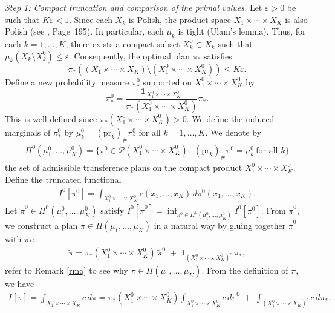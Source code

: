 \documentclass[twoside,11pt,a4paper]{article}
\newcommand*{\SavedRef}{}
\let\SavedRef\ref
\renewcommand*{\ref}[1]{  \begingroup
    \hypersetup{
      linkcolor=linkequation,
      linkbordercolor=linkequation,
    }    \SavedRef{#1}  \endgroup
}
\begin{document}
\medskip
\noindent\emph{Step 1: Compact truncation and comparison of the primal values.}
 Let $\varepsilon>0$ be such that $K\varepsilon<1$. Since each $X_k$ is Polish, the product space $X_1 \times \cdots \times X_K$ is also Polish (see \cite{bourbaki1998}, Page~195). In particular, each $\mu_k$ is tight (Ulam's lemma). Thus, for each 
$k=1,\dots,K$, there exists a compact subset $X_k^0 \subset X_k$ such that $\mu_k(X_k \setminus X_k^0) \le \varepsilon$. Consequently, the optimal plan $\pi_*$ satisfies
\begin{equation}\label{5}
\pi_*\!\left( (X_1 \times \cdots \times X_K) 
\setminus (X_1^0 \times \cdots \times X_K^0) \right)
\le K\varepsilon .
\end{equation}
Define a new probability measure $\pi^0_*$ supported on $X_1^0 \times \cdots \times X_K^0$ by
\begin{equation}\label{uuu}
\pi^0_*
=
\frac{
\mathbf{1}_{\,X_1^0 \times \cdots \times X_K^0}\,
}{
\pi_*(X_1^0 \times \cdots \times X_K^0)}  \pi_*.
\end{equation}
This is well defined since
$\pi_*(X_1^0 \times \cdots \times X_K^0) > 0$. We define the induced marginals of $\pi_*^0$ by $\mu_k^0 = (\mathrm{pr}_k)_\# \pi_*^0
\text{ for all } k=1,\dots,K$. We denote by
\begin{align*}
\Pi^0(\mu_1^0,\dots,\mu_K^0)
=
\Big\{
\pi^0 \in \mathcal P(X_1^0\times\cdots\times X_K^0)
:\; (\mathrm{pr}_k)_\#\pi^0 = \mu_k^0 \ \text{for all } k
\Big\}
\end{align*}
the set of admissible transference plans on the compact product
$X_1^0\times\cdots\times X_K^0$. Define the truncated functional
\begin{align*}
I^0[\pi^0]
=
\int_{X_1^0 \times \cdots \times X_K^0}
c(x_1,\dots,x_K)\, d\pi^0(x_1,\dots,x_K).
\end{align*}
Let $\widetilde{\pi}^0 \in \Pi^0(\mu_1^0,\dots,\mu_K^0)$ satisfy $I^0[\widetilde{\pi}^0]
=
\inf_{\pi^0 \in \Pi^0(\mu_1^0,\dots,\mu_K^0)} I^0[\pi^0]$. From $\widetilde{\pi}^0$, we construct a plan
$\widetilde{\pi} \in \Pi(\mu_1,\dots,\mu_K)$ in a natural way by gluing together 
$\widetilde{\pi}^0$ with $\pi_*$:
\begin{align*}
\widetilde{\pi}
=
\pi_*(X_1^0 \times \cdots \times X_K^0)\, \widetilde{\pi}^0
\;+\;
\mathbf{1}_{(X_1^0 \times \cdots \times X_K^0)^c}\, \pi_* ,
\end{align*}
refer to Remark \ref{rmq} to see why $\widetilde{\pi} \in \Pi(\mu_1,\dots,\mu_K)$. From the definition of $\widetilde{\pi}$, we have
\begin{align*}
I[\widetilde{\pi}]=
\int_{X_1 \times \cdots \times X_K} c \, d\widetilde{\pi} =
\pi_*(X_1^0 \times \cdots \times X_K^0)
\int_{X_1^0 \times \cdots \times X_K^0} c \, d\widetilde{\pi}^0
\;+\;
\int_{(X_1^0 \times \cdots \times X_K^0)^c} c \, d\pi_*.
\end{align*}
\end{document}
